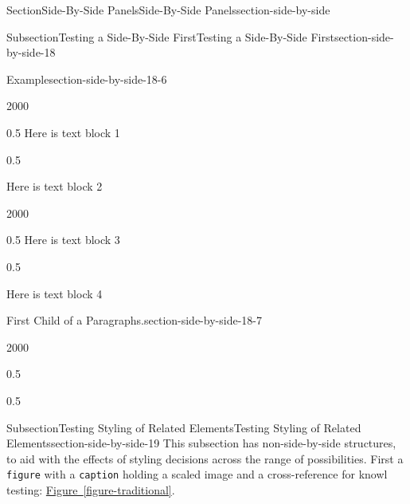 \documentclass[twoside,10pt,]{article}
\newcommand{\tabularfont}{\relax}
\newcommand{\xreffont}{\relax}
\newcommand{\mono}[1]{\texttt{#1}}
\numberwithin{equation}{section}
\begin{document}
\begin{sectionptx}{Section}{Side-By-Side Panels}{}{Side-By-Side Panels}{}{}{section-side-by-side}
\begin{subsectionptx}{Subsection}{Testing a Side-By-Side First}{}{Testing a Side-By-Side First}{}{}{section-side-by-side-18}
\begin{example}{Example}{}{section-side-by-side-18-6}
\begin{sidebyside}{2}{0}{0}{0}
\begin{sbspanel}{0.5}%
Here is text block 1%
\end{sbspanel}%
\begin{sbspanel}{0.5}%
\par
Here is text block 2%
\end{sbspanel}%
\end{sidebyside}%
\begin{sidebyside}{2}{0}{0}{0}%
\begin{sbspanel}{0.5}%
Here is text block 3%
\end{sbspanel}%
\begin{sbspanel}{0.5}%
\par
Here is text block 4%
\end{sbspanel}%
\end{sidebyside}%
\end{example}
\begin{paragraphs}{First Child of a Paragraphs.}{section-side-by-side-18-7}%
\leavevmode\par\noindent%
\begin{sidebyside}{2}{0}{0}{0}%
\begin{sbspanel}{0.5}%
\noindent\resizebox{\ifdim\width > \linewidth\linewidth\else\width\fi}{!}{%
{\centering%
{\tabularfont%
\begin{tabular}{ll}
A&B\tabularnewline[0pt]
C&D
\end{tabular}
}%
\par}
}%
\end{sbspanel}%
\begin{sbspanel}{0.5}%
\noindent\resizebox{\ifdim\width > \linewidth\linewidth\else\width\fi}{!}{%
{\centering%
{\tabularfont%
\begin{tabular}{ll}
\(\alpha\)&\(\beta\)\tabularnewline[0pt]
\(\gamma\)&\(\delta\)
\end{tabular}
}%
\par}
}%
\end{sbspanel}%
\end{sidebyside}%
\end{paragraphs}%
\end{subsectionptx}
%
%
\typeout{************************************************}
\typeout{************************************************}
%
\begin{subsectionptx}{Subsection}{Testing Styling of Related Elements}{}{Testing Styling of Related Elements}{}{}{section-side-by-side-19}
This subsection has non-side-by-side structures, to aid with the effects of styling decisions across the range of possibilities.  First a \mono{figure} with a \mono{caption} holding a scaled image and a cross-reference for knowl testing: \hyperref[figure-traditional]{Figure~{\xreffont\ref{figure-traditional}}}.%

\end{subsectionptx}
\end{sectionptx}
\end{document}
